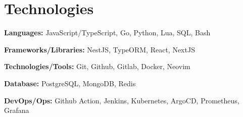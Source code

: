 \section{Technologies}

\begin{onecolentry}
	\textbf{Languages:}
	JavaScript/TypeScript,
	Go,
	Python,
	Lua,
	SQL,
	Bash
\end{onecolentry}

\vspace{0.2 cm}

\begin{onecolentry}
	\textbf{Frameworks/Libraries:}
	NestJS,
	TypeORM,
	React,
	NextJS
\end{onecolentry}

\vspace{0.2 cm}

\begin{onecolentry}
	\textbf{Technologies/Tools:}
	Git,
	Github,
	Gitlab,
	Docker,
	Neovim
\end{onecolentry}

\vspace{0.2 cm}

\begin{onecolentry}
	\textbf{Database:}
	PostgreSQL,
	MongoDB,
	Redis
\end{onecolentry}

\vspace{0.2 cm}

\begin{onecolentry}
	\textbf{DevOps/Ops:}
	Github Action,
	Jenkins,
	Kubernetes,
	ArgoCD,
	Prometheus,
	Grafana
\end{onecolentry}

%
%
%
